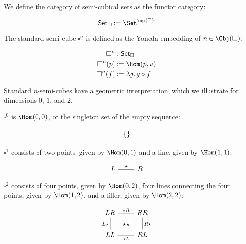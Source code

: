 \documentclass[10pt]{art.cls/art}
\newcommand{\Cube}{\ensuremath{\boldsymbol{\square}}}
\newcommand{\CSet}{\ensuremath{\mathsf{Set}_{\boldsymbol{\square}}}}
\newcommand{\kstar}{{\star}}
\begin{document}
\begin{definition}[\CSet]
  We define the category of semi-cubical sets as the functor category:

  \begin{equation*}
    \CSet := \Set^{\op{\Cube}}
  \end{equation*}
\end{definition}

\begin{definition}[$\Cube^n$]
  The standard semi-cube $\Cube^n$ is defined as the Yoneda embedding of $n\in\Obj(\Cube)$:

  \begin{align*}
    \Cube^n    & : \CSet                    \\
    \Cube^n(p) & := \Hom(p, n)              \\
    \Cube^n(f) & := \lambda g .\, g \circ f
  \end{align*}
\end{definition}

Standard $n$-semi-cubes have a geometric interpretation, which we illustrate for dimensions $0$, $1$, and $2$.

\begin{example}[$\Cube^0$]
  $\Cube^0$ is $\Hom(0, 0)$, or the singleton set of the empty sequence:

  \begin{equation*}
    \begin{tikzcd}
      \{\}
    \end{tikzcd}
  \end{equation*}
\end{example}

\begin{example}[$\Cube^1$]
  $\Cube^1$ consists of two points, given by $\Hom(0, 1)$ and a line, given by $\Hom(1, 1)$:

  \begin{equation*}
    \begin{tikzcd}
      L \arrow[r, "\kstar", dash] & R
    \end{tikzcd}
  \end{equation*}
\end{example}

\begin{example}[$\Cube^2$]
  $\Cube^2$ consists of four points, given by $\Hom(0, 2)$, four lines connecting the four points, given by $\Hom(1, 2)$, and a filler, given by $\Hom(2, 2)$:

  \begin{equation*}
    \begin{tikzcd}
      LR \arrow[r, dash, "\kstar R"{name=F}] \arrow[d, dash, "L\kstar" left] & RR \arrow[d, dash, "R\kstar"] \\
      LL \arrow[r, dash, "\kstar L"{name=T, below}] & RL \\
      \arrow[rightarrow, from=F, to=T, phantom, "\kstar\kstar" description]
    \end{tikzcd}
  \end{equation*}
\end{example}
\end{document}
